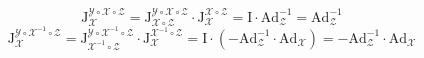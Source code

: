 \documentclass[12pt, onecolumn]{article}
\newcommand\bsm[1]{\boldsymbol{\mathrm{#1}}}
\begin{document}
	\vspace{5mm}
	\begin{equation}
	\bsm{J}_{\mathcal{X}}^{\mathcal{Y}\circ\mathcal{X}\circ\mathcal{Z}}=
	\bsm{J}_{\mathcal{X}\circ\mathcal{Z}}^{\mathcal{Y}\circ\mathcal{X}\circ\mathcal{Z}}\cdot\bsm{J}_{\mathcal{X}}^{\mathcal{X}\circ\mathcal{Z}}
	=\bsm{I}\cdot\bsm{Ad}_{\mathcal{Z}}^{-1}=\bsm{Ad}_{\mathcal{Z}}^{-1}
	\end{equation}
	\vspace{5mm}
	\begin{equation}
	\bsm{J}_{\mathcal{X}}^{\mathcal{Y}\circ\mathcal{X}^{-1}\circ\mathcal{Z}}=
	\bsm{J}_{\mathcal{X}^{-1}\circ\mathcal{Z}}^{\mathcal{Y}\circ\mathcal{X}^{-1}\circ\mathcal{Z}}\cdot\bsm{J}_{\mathcal{X}}^{\mathcal{X}^{-1}\circ\mathcal{Z}}
	=\bsm{I}\cdot\left( -\bsm{Ad}_{\mathcal{Z}}^{-1}\cdot\bsm{Ad}_{\mathcal{X}}\right)
	= -\bsm{Ad}_{\mathcal{Z}}^{-1}\cdot\bsm{Ad}_{\mathcal{X}}
	\end{equation}
	
\end{document}
